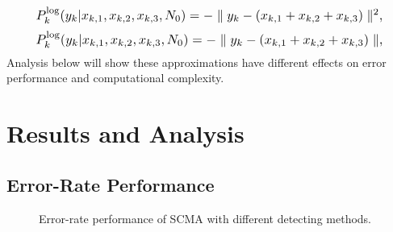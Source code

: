 \documentclass[journal,twoside]{IEEEtran}
\begin{document}
\begin{equation}
\label{equ:log111}
\resizebox{.89\linewidth}{!}{$
P_{k}^{\log}(y_{k}|x_{k,1},x_{k,2},x_{k,3},N_{0}) = -\parallel y_{k}-(x_{k,1}+x_{k,2}+x_{k,3})\parallel^{2},
$}
\end{equation}
\begin{equation}
\label{equ:log1111}
\resizebox{.89\linewidth}{!}{$
P_{k}^{\log}(y_{k}|x_{k,1},x_{k,2},x_{k,3},N_{0}) = -\parallel y_{k}-(x_{k,1}+x_{k,2}+x_{k,3})\parallel,
$}
\end{equation}
Analysis below will show these approximations have different effects on error performance and computational complexity.

\section{Results and Analysis}\label{sec:Results}
\subsection{Error-Rate Performance}
\begin{figure*}[htbp]
  \centering
  \caption{Error-rate performance of SCMA with different detecting methods.}
  \label{fig:Error_performance_of_SCMA} %
\end{figure*}
\end{document}
